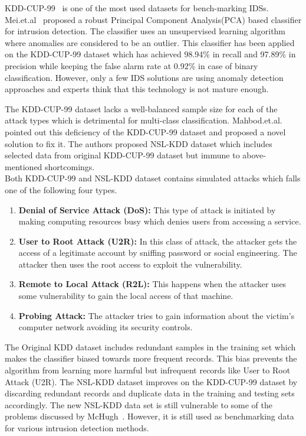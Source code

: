 \documentclass[conference]{IEEEtran}
\begin{document}
KDD-CUP-99~\cite{KDDcup99} is one of the most used datasets for bench-marking IDSs. Mei.et.al~\cite{shyu2003novel} proposed a robust Principal Component Analysis(PCA) based classifier for intrusion detection. The classifier uses an unsupervised learning algorithm where anomalies are considered to be an outlier. This classifier has been applied on the KDD-CUP-99 dataset which has achieved 98.94\% in recall and 97.89\% in precision while keeping the false alarm rate at 0.92\% in case of binary classification. However, only a few IDS solutions are using anomaly detection approaches and experts think that this technology is not mature enough. 

The KDD-CUP-99 dataset lacks a well-balanced sample size for each of the attack types which is detrimental for multi-class classification. Mahbod.et.al.~\cite{NSL_kdd} pointed out this deficiency of the KDD-CUP-99 dataset and proposed a novel solution to fix it. The authors proposed NSL-KDD dataset which includes selected data from original KDD-CUP-99 dataset but immune to above-mentioned shortcomings.\\
Both KDD-CUP-99 and NSL-KDD dataset contains simulated attacks which falls one of the following four types.\\
\begin{enumerate}
    \item \textbf{Denial of Service Attack (DoS):} This type of attack is initiated by making computing resources busy which denies users from accessing a service.
    \item \textbf{User to Root Attack (U2R):} In this class of attack, the attacker gets the access of a legitimate account by sniffing password or social engineering. The attacker then uses the root access to exploit the vulnerability.
    \item \textbf{Remote to Local Attack (R2L):} This happens when the attacker uses some vulnerability to gain the local access of that machine. 
    \item \textbf{Probing Attack:} The attacker tries to gain information about the victim's computer network avoiding its security controls.
\end{enumerate}

The Original KDD dataset includes redundant samples in the training set which makes the classifier biased towards more frequent records. This bias prevents the algorithm from learning more harmful but infrequent records like User to Root Attack (U2R). The NSL-KDD dataset improves on the KDD-CUP-99 dataset by discarding redundant records and duplicate data in the training and testing sets accordingly. The new NSL-KDD data set is still vulnerable to some of the problems discussed by McHugh~\cite{mchugh2000testing}. However, it is still used as benchmarking data for various intrusion detection methods. 
\end{document}
